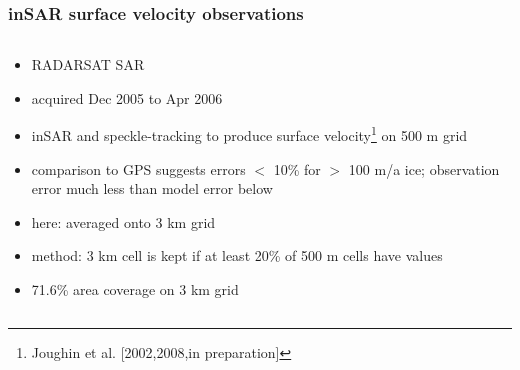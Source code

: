 \documentclass{beamer}
\begin{document}
\begin{frame}
  \frametitle{inSAR surface velocity observations}

\begin{columns}
\begin{column}{0.65\textwidth}

\begin{itemize}
\item RADARSAT SAR
\item acquired Dec 2005 to Apr 2006
\item inSAR and speckle-tracking to produce surface velocity\footnote{\tiny Joughin et al. [2002,2008,in preparation]} on 500 m grid
\item comparison to GPS suggests errors $<$ 10\% for $>$ 100 m/a ice; observation error much less than model error below
\item here: averaged onto 3 km grid
\item \scriptsize  method: 3 km cell is kept if at least 20\% of 500 m cells have values
\item \normalsize 71.6\% area coverage on 3 km grid
\end{itemize}
\end{column}


\end{columns}
\end{frame}
\end{document}
